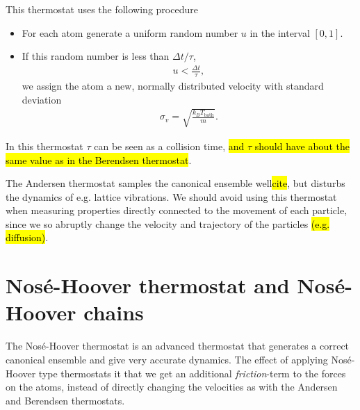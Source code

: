 This thermostat uses the following procedure%
%
\begin{itemize}
    \item For each atom generate a uniform random number $u$ in the interval $[0,1]$.
    \item If this random number is less than $\Delta t/\tau$,
        \begin{align*}
            u < \frac{\Delta t}{\tau},
        \end{align*}
        we assign the atom a new, normally distributed velocity with standard deviation
        \begin{align*}
            \sigma_v = \sqrt{\frac{k_B T_\text{bath}}{m}}.
        \end{align*}
\end{itemize}
%
In this thermostat $\tau$ can be seen as a collision time, \hl{and $\tau$ should have about the same value as in the Berendsen thermostat}.

The Andersen thermostat samples the canonical ensemble well\hl{cite}, but disturbs the dynamics of e.g. lattice vibrations. We should avoid using this thermostat when measuring properties directly connected to the movement of each particle, since we so abruptly change the velocity and trajectory of the particles \hl{(e.g. diffusion)}.

\section{Nos\'e-Hoover thermostat and Nos\'e-Hoover chains}
The Nos\'e-Hoover thermostat is an advanced thermostat %
that generates a correct canonical ensemble %
and give very accurate dynamics\cite[section 6.1]{frenkel2001understanding}. The effect of applying Nosé-Hoover type thermostats it that we get an additional \emph{friction}-term to the forces on the atoms, instead of directly changing the velocities as with the Andersen and Berendsen thermostats.



